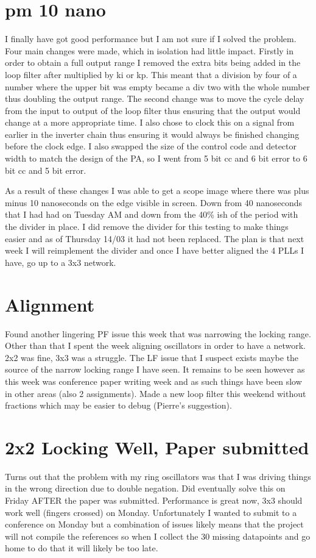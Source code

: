 \documentclass[a4paper,12pt]{report}
\begin{document}
\section*{pm 10 nano}
I finally have got good performance but I am not sure if I solved the problem. Four main changes were made, which in isolation had little impact. Firstly in order to obtain a full output range I removed the extra bits being added in the loop filter after multiplied by ki or kp. This meant that a division by four of a number where the upper bit was empty became a div two with the whole number thus doubling the output range. The second change was to move the cycle delay from the input to output of the loop filter thus ensuring that the output would change at a more appropriate time. I also chose to clock this on a signal from earlier in the inverter chain thus ensuring it would always be finished changing before the clock edge. I also swapped the size of the control code and detector width to match the design of the PA, so I went from 5 bit cc and 6 bit error to 6 bit cc and 5 bit error.

As a result of these changes I was able to get a scope image where there was plus minus 10 nanoseconds on the edge visible in screen. Down from 40 nanoseconds that I had had on Tuesday AM and down from the 40\% ish of the period with the divider in place. I did remove the divider for this testing to make things easier and as of Thursday 14/03 it had not been replaced. The plan is that next week I will reimplement the divider and once I have better aligned the 4 PLLs I have, go up to a 3x3 network.
\section*{Alignment}
Found another lingering PF issue this week that was narrowing the locking range. Other than that I spent the week aligning oscillators in order to have a network. 2x2 was fine, 3x3 was a struggle. The LF issue that I suspect exists maybe the source of the narrow locking range I have seen. It remains to be seen however as this week was conference paper writing week and as such things have been slow in other areas (also 2 assignments). Made a new loop filter this weekend without fractions which may be easier to debug (Pierre's suggestion).
\section*{2x2 Locking Well, Paper submitted}
Turns out that the problem with my ring oscillators was that I was driving things in the wrong direction due to double negation. Did eventually solve this on Friday AFTER the paper was submitted. Performance is great now, 3x3 should work well (fingers crossed) on Monday. Unfortunately I wanted to submit to a conference on Monday but a combination of issues likely means that the project will not compile the references so when I collect the 30 missing datapoints and go home to do that it will likely be too late.
\end{document}
